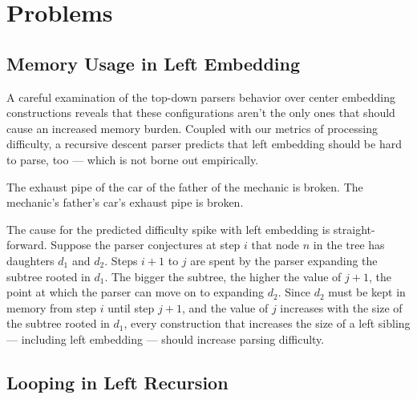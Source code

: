 \section{Problems}
\label{sec:TopDownEval_Problems}

\subsection{Memory Usage in Left Embedding}
\label{sub:TopDownEval_LeftEmbedding}
A careful examination of the top-down parsers behavior over center embedding constructions reveals that these configurations aren't the only ones that should cause an increased memory burden.
Coupled with our metrics of processing difficulty, a recursive descent parser predicts that left embedding should be hard to parse, too --- which is not borne out empirically.
%
\begin{exe}
    \ex
    \begin{xlist}
        \ex The exhaust pipe of the car of the father of the mechanic is broken.
        \ex The mechanic's father's car's exhaust pipe is broken.
    \end{xlist}
\end{exe}
%
The cause for the predicted difficulty spike with left embedding is straight-forward.
Suppose the parser conjectures at step $i$ that node $n$ in the tree has daughters $d_1$ and $d_2$.
Steps $i+1$ to $j$ are spent by the parser expanding the subtree rooted in $d_1$.
The bigger the subtree, the higher the value of $j + 1$, the point at which the parser can move on to expanding $d_2$.
Since $d_2$ must be kept in memory from step $i$ until step $j + 1$, and the value of $j$ increases with the size of the subtree rooted in $d_1$, every construction that increases the size of a left sibling --- including left embedding --- should increase parsing difficulty.

\subsection{Looping in Left Recursion}
\label{sub:TopDownEval_LeftRecursion}


